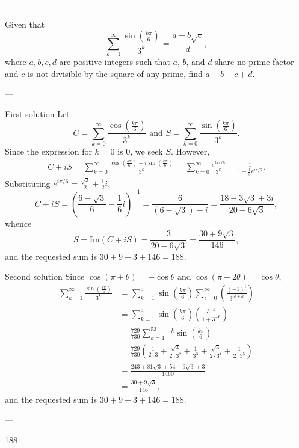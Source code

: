 
---

Given that \[\sum_{k=1}^\infty\frac{\sin(\frac{k\pi}6)}{3^k}=\frac{a+b\sqrt c}d,\]
where $a,b,c,d$ are positive integers such that $a$, $b$, and $d$ share no prime factor and $c$ is not divisible by the square of any prime, find $a+b+c+d$.

---

\begin{customenv}{First solution}
    Let \[C=\sum_{k=0}^\infty\frac{\cos(\frac{k\pi}6)}{3^k}\text{ and }S=\sum_{k=0}^\infty\frac{\sin(\frac{k\pi}6)}{3^k}.\]
    Since the expression for $k=0$ is $0$, we seek $S$. However,
    \begin{align*}
        C+iS=\sum_{k=0}^\infty\frac{\cos(\frac{k\pi}6)+i\sin(\frac{k\pi}6)}{3^k}=\sum_{k=0}^\infty\frac{e^{ki\pi/6}}{3^k}=\frac1{1-\frac13e^{i\pi/6}}.
    \end{align*}
    Substituting $e^{i\pi/6}=\tfrac{\sqrt3}2+\tfrac12i$, \[C+iS=\left(\frac{6-\sqrt3}6-\frac16i\right)^{-1}=\frac6{(6-\sqrt3)-i}=\frac{18-3\sqrt3+3i}{20-6\sqrt3},\]
    whence \[S=\text{Im}(C+iS)=\frac3{20-6\sqrt3}=\frac{30+9\sqrt3}{146},\]
    and the requested sum is $30+9+3+146=188$.
\end{customenv}
\begin{customenv}{Second solution}
    Since $\cos(\pi+\theta)=-\cos\theta$ and $\cos(\pi+2\theta)=\cos\theta$,
    \begin{align*}
        \sum_{k=1}^\infty\frac{\sin(\frac{k\pi}6)}{3^k}&=\sum_{k=1}^5\sin\left(\frac{k\pi}6\right)\sum_{i=0}^\infty\left(\frac{(-1)^i}{3^{6i+k}}\right)\\
        &=\sum_{k=1}^5\sin\left(\frac{k\pi}6\right)\left(\frac{3^{-k}}{1+3^{-6}}\right)\\
        &=\frac{729}{730}\sum_{k=1}^53^{-k}\sin\left(\frac{k\pi}6\right)\\
        &=\frac{729}{730}\left(\frac1{2\cdot 3}+\frac{\sqrt3}{2\cdot 3^2}+\frac1{3^3}+\frac{\sqrt3}{2\cdot 3^4}+\frac1{2\cdot 3^5}\right)\\
        &=\frac{243+81\sqrt3+54+9\sqrt3+3}{1460}\\
        &=\frac{30+9\sqrt3}{146},
    \end{align*}
    and the requested sum is $30+9+3+146=188$.
\end{customenv}

---

188

